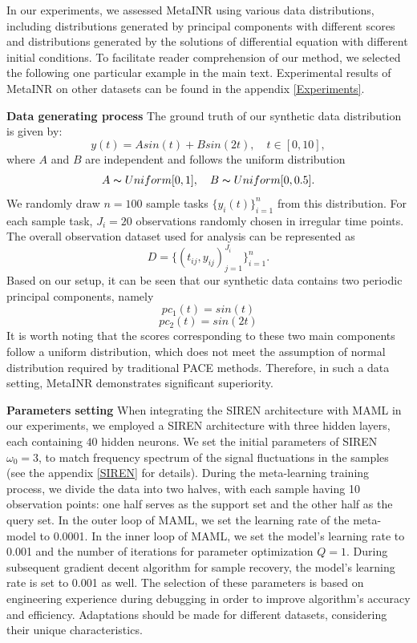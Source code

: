 \documentclass{article}
\begin{document}

In our experiments, we assessed MetaINR using various data distributions, 
including distributions generated by principal components with different scores
and distributions generated by the solutions of differential equation with different initial conditions. 
To facilitate reader comprehension of our method, we selected the following one particular example in the main text.
Experimental results of MetaINR on other datasets can be found in the appendix \ref{Experiments}.

\textbf{Data generating process}
The ground truth of our synthetic data distribution is given by:
$$
y(t)=A sin(t)+ B sin(2t), \quad t \in [0,10],
$$
where $A$ and $B$ are independent and follows the uniform distribution
$$
A \thicksim Uniform[0,1], \quad B \thicksim Uniform[0,0.5].
$$
We randomly draw $n=100$ sample tasks $\{y_i(t)\}_{i=1}^n$ from this distribution.
For each sample task, $J_i=20$ observations randomly chosen in irregular time points.
The overall observation dataset used for analysis can be represented as
$$
D=\{(t_{ij},y_{ij})_{j=1}^{J_i}\}_{i=1}^n.
$$
Based on our setup, it can be seen that our synthetic data contains two periodic principal components, namely
$$
pc_1(t)=sin(t)
$$
$$
pc_2(t)=sin(2t)
$$
It is worth noting that the scores corresponding to these two main components follow a uniform distribution, 
which does not meet the assumption of normal distribution required by traditional PACE methods. 
Therefore, in such a data setting, MetaINR demonstrates significant superiority.

\textbf{Parameters setting} 
When integrating the SIREN architecture with MAML in our experiments, 
we employed a SIREN architecture with three hidden layers, each containing $40$ hidden neurons.
We set the initial parameters of SIREN $\omega_0=3$, to match frequency spectrum of the signal fluctuations in the samples (see the appendix \ref{SIREN} for details).
During the meta-learning training process, we divide the data into two halves, with each sample having 10 observation points: one half serves as the support set and the other half as the query set.
In the outer loop of MAML, we set the learning rate of the meta-model to 0.0001. 
In the inner loop of MAML, we set the model's learning rate to 0.001 and the number of iterations for parameter optimization $Q=1$.
During subsequent gradient decent algorithm for sample recovery, the model's learning rate is set to 0.001 as well.
The selection of these parameters is based on engineering experience during debugging in order to improve algorithm's accuracy and efficiency.
Adaptations should be made for different datasets, considering their unique characteristics.
\end{document}
